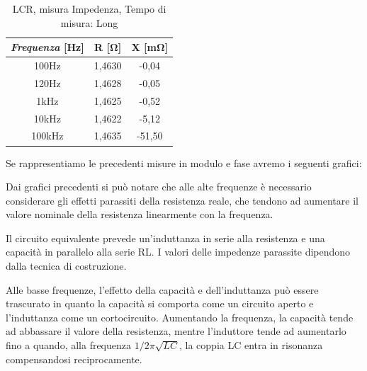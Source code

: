 \begin{table}[!ht]
\centering
\begin{tabular}{|c|c|c|}
\hline
\textit{\textbf{Frequenza}} \textbf{[Hz]} & \textbf{R [$\bm{\Omega}$]}  & \textbf{X [m$\bm{\Omega}$]}  \\ \hline
100Hz                       & 1,4630    & -0,04      \\ \hline
120Hz                       & 1,4628    & -0,05      \\ \hline
1kHz                        & 1,4625    & -0,52      \\ \hline
10kHz                       & 1,4622    & -5,12      \\ \hline
100kHz                      & 1,4635    & -51,50     \\ \hline
\end{tabular}
\caption{LCR, misura Impedenza, Tempo di misura: Long}
\label{tab:lcr_z}
\end{table}
\FloatBarrier


Se rappresentiamo le precedenti misure in modulo e fase avremo i seguenti grafici:
%

Dai grafici precedenti si può notare che alle alte frequenze è necessario considerare gli effetti parassiti della resistenza reale, che tendono ad aumentare il valore nominale della resistenza linearmente con la frequenza.

Il circuito equivalente prevede un'induttanza in serie alla resistenza e una capacità in parallelo alla serie RL. I valori delle impedenze parassite dipendono dalla tecnica di costruzione.

Alle basse frequenze, l'effetto della capacità e dell'induttanza può essere trascurato in quanto la capacità si comporta come un circuito aperto e l'induttanza come un cortocircuito. Aumentando la frequenza, la capacità tende ad abbassare il valore della resistenza, mentre l'induttore tende ad aumentarlo fino a quando, alla frequenza $1/2\pi\sqrt{LC}$, la coppia LC entra in risonanza compensandosi reciprocamente.

